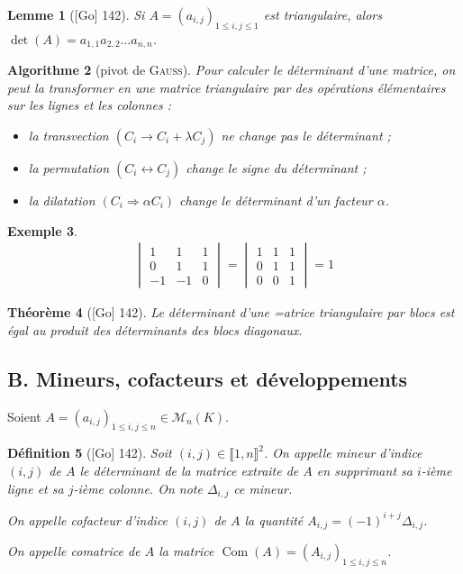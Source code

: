 \documentclass[10pt, a4paper, parskip=full, twoside, twocolumn]{report}
\newtheorem{definition}{Définition}
\newtheorem{theorem}[definition]{Théorème}
\newtheorem{lemma}[definition]{Lemme}
\newtheorem{example}[definition]{Exemple}
\newtheorem{algorithm}[definition]{Algorithme}
\newcommand{\M}{\mathcal{M}}
\DeclareMathOperator{\Com}{Com}
\begin{document}
\begin{lemma}[\textnormal{[Go] 142}]
	Si $A = \left(a_{i,j}\right)_{1\leq i,j\leq 1}$ est triangulaire, 
	alors $\det(A) = a_{1,1}a_{2,2}\dots a_{n,n}$.
\end{lemma}

\begin{algorithm}[pivot de \textsc{Gauss}]
	Pour calculer le déterminant d'une matrice, 
	on peut la transformer en une matrice triangulaire par des opérations élémentaires sur les lignes et 
	les colonnes :
	\begin{itemize}
		\item la transvection $(C_i \longrightarrow C_i+\lambda C_j)$ ne change pas le déterminant ;
		\item la permutation $(C_i \longleftrightarrow C_j)$ change le signe du déterminant ;
		\item la dilatation $(C_i \Longrightarrow \alpha C_i)$ change le déterminant d'un facteur $\alpha$.
	\end{itemize}
\end{algorithm}

\begin{example}
	\begin{align*}
		\begin{vmatrix}
			1&1&1\\
			0&1&1\\
			-1&-1&0
		\end{vmatrix}=
		\begin{vmatrix}
			1&1&1\\
			0&1&1\\
			0&0&1
		\end{vmatrix} = 1
	\end{align*}
\end{example}

\begin{theorem}[\textnormal{[Go] 142}]
	Le déterminant d'une =atrice triangulaire par blocs est égal au produit des déterminants des blocs diagonaux.
\end{theorem}


\subsection*{B. Mineurs, cofacteurs et développements}

\textcolor{paragraphtext}{Soient $A=\left(a_{i,j}\right)_{1\leq i,j\leq n}\in\M_n(K)$.}
\begin{definition}[\textnormal{[Go] 142}]
	Soit $(i,j)\in \llbracket 1,n \rrbracket ^2$.
	On appelle \emph{mineur d'indice $(i,j)$ de $A$} le déterminant de la matrice extraite de $A$
	en supprimant sa $i$-ième ligne et sa $j$-ième colonne.
	On note $\Delta_{i,j}$ ce mineur.
	
	On appelle \emph{cofacteur d'indice $(i,j)$ de $A$} la quantité $A_{i,j} = \left(-1\right)^{i+j}\Delta_{i,j}$.

	On appelle \emph{comatrice de $A$} la matrice $\Com(A) = \left(A_{i,j}\right)_{1\leq i,j\leq n}$.
\end{definition}
\end{document}
